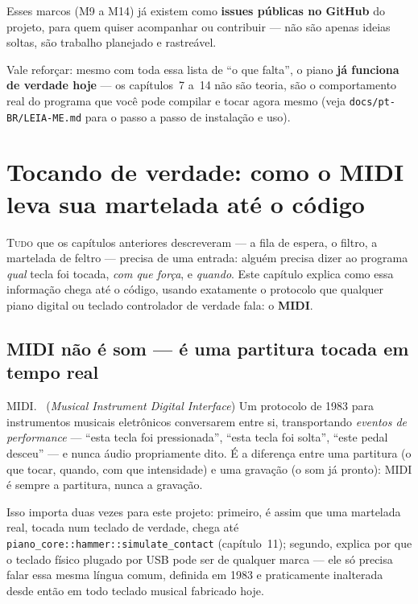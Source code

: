 \documentclass[11pt,oneside]{book}
\newcommand{\nova}[1]{\textsc{\color{accent}#1.}~}
\newcommand{\opening}[2]{\lettrine[lines=2,loversize=0.08,lraise=0.02]{#1}{#2}}
\begin{document}
Esses marcos (M9 a M14) já existem como \textbf{issues públicas no GitHub}
do projeto, para quem quiser acompanhar ou contribuir --- não são apenas
ideias soltas, são trabalho planejado e rastreável.

Vale reforçar: mesmo com toda essa lista de \enquote{o que falta}, o piano
\textbf{já funciona de verdade hoje} --- os capítulos~7 a~14 não são
teoria, são o comportamento real do programa que você pode compilar e
tocar agora mesmo (veja \texttt{docs/pt-BR/LEIA-ME.md} para o passo a
passo de instalação e uso).

\chapter{Tocando de verdade: como o MIDI leva sua martelada até o código}

\opening{T}{udo} que os capítulos anteriores descreveram --- a fila de
espera, o filtro, a martelada de feltro --- precisa de uma entrada: alguém
precisa dizer ao programa \emph{qual} tecla foi tocada, \emph{com que
força}, e \emph{quando}. Este capítulo explica como essa informação chega
até o código, usando exatamente o protocolo que qualquer piano digital ou
teclado controlador de verdade fala: o \textbf{MIDI}.

\section*{MIDI não é som --- é uma partitura tocada em tempo real}

\begin{newword}
\nova{MIDI} (\emph{Musical Instrument Digital Interface}) Um protocolo de
1983 para instrumentos musicais eletrônicos conversarem entre si,
transportando \emph{eventos de performance} --- \enquote{esta tecla foi
pressionada}, \enquote{esta tecla foi solta}, \enquote{este pedal desceu}
--- e nunca áudio propriamente dito. É a diferença entre uma partitura (o
que tocar, quando, com que intensidade) e uma gravação (o som já pronto):
MIDI é sempre a partitura, nunca a gravação.
\end{newword}

Isso importa duas vezes para este projeto: primeiro, é assim que uma
martelada real, tocada num teclado de verdade, chega até
\texttt{piano\_core::hammer::simulate\_contact} (capítulo~11); segundo,
explica por que o teclado físico plugado por USB pode ser de qualquer
marca --- ele só precisa falar essa mesma língua comum, definida em 1983 e
praticamente inalterada desde então em todo teclado musical fabricado
hoje.
\end{document}
